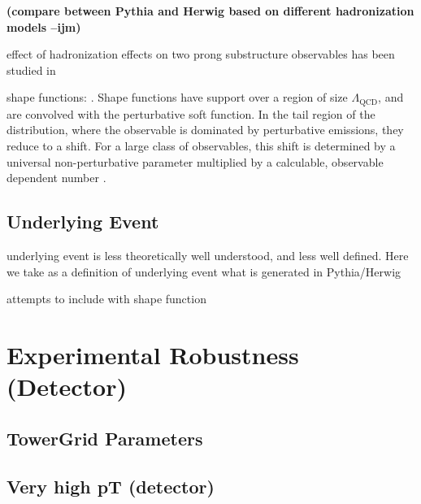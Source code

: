 \documentclass[11pt,letterpaper]{article}
\newcommand{\ijm}[1]{\textbf{\textcolor{llblue}{(#1 --ijm)}}}
\begin{document}
\ijm{compare between Pythia and Herwig based on different hadronization models}

effect of hadronization effects on two prong substructure observables has been studied in \cite{Larkoski:2015kga}\cite{Salam:2016yht}

shape functions: \cite{Korchemsky:1999kt,Korchemsky:2000kp,Bosch:2004th,Hoang:2007vb,Ligeti:2008ac}. Shape functions have support over a region of size $\Lambda_{\text{QCD}}$, and are convolved with the perturbative soft function. In the tail region of the distribution, where the observable is dominated by perturbative emissions, they reduce to a shift.  For a large class of observables, this shift is determined by a universal \cite{Akhoury:1995sp,Dokshitzer:1995zt} non-perturbative parameter multiplied by a calculable, observable dependent number \cite{Dokshitzer:1995zt,Lee:2006fn,Lee:2007jr}. 



\subsection{Underlying Event}

underlying event is less theoretically well understood, and less well defined. Here we take as a definition of underlying event what is generated in Pythia/Herwig

attempts to include with shape function \cite{Stewart:2014nna}


\section{Experimental Robustness (Detector)}


\subsection{TowerGrid Parameters}


\subsection{Very high pT (detector)}


\end{document}
